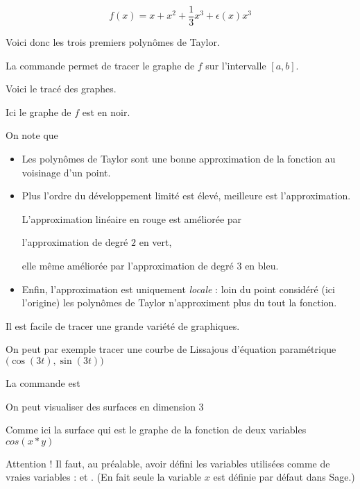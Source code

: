   $$f(x) = x + x^2 + \frac13 x^3+ \epsilon(x) x^3$$

\change
Voici donc les trois premiers polynômes de Taylor.

\change
La commande  permet de 
tracer le graphe de $f$ sur l'intervalle $[a,b]$.


\diapo

Voici le tracé des graphes.

Ici le graphe de $f$ est en noir.

On note que 
\begin{itemize}
  \item Les polynômes de Taylor sont une bonne approximation de la fonction 
  au voisinage d'un point. 
  
  \item Plus l'ordre du développement limité est élevé, meilleure est l'approximation. 

  L'approximation linéaire en rouge est améliorée par 

  l'approximation de degré $2$ en vert, 

  elle même améliorée par l'approximation de degré $3$ en bleu.

  \item Enfin, l'approximation est uniquement \emph{locale} : 
  loin du point considéré (ici l'origine)
  les polynômes de Taylor n'approximent plus du tout la fonction.
\end{itemize}



\diapo



Il est facile de tracer une grande variété de graphiques.


On peut par exemple tracer une courbe de Lissajous
d'équation paramétrique $\big(\cos(3t),\sin(3t)\big)$

\change
La commande est 

\change

\change
On peut visualiser des surfaces en dimension $3$

Comme ici la surface qui est le graphe 
de la fonction de deux variables $cos(x*y)$

\change
Attention ! Il faut, au préalable, avoir défini les variables utilisées comme de vraies variables : 
et . (En fait seule la variable $x$ est définie par défaut dans Sage.)


